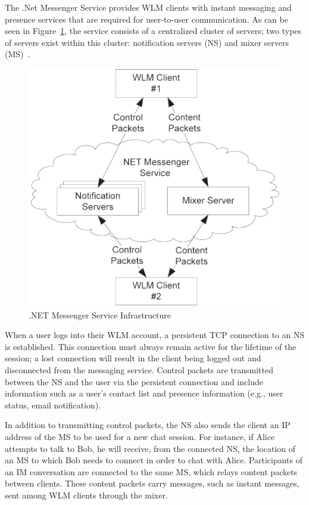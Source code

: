 \documentclass{sig-alternate}
\begin{document}
The .Net Messenger Service provides WLM clients with instant messaging and presence services that are required for user-to-user communication.
As can be seen in Figure~\ref{fig:wlminfrastructure}, the service consists of a centralized cluster of servers; two types of servers exist within this cluster: notification servers (NS) and mixer servers (MS)~\cite{torre:wlm}.

\begin{figure}[h]
	\centering
	\caption{.NET Messenger Service Infrastructure}
	\label{fig:wlminfrastructure}
	\includegraphics{graphics/infrastructure}
\end{figure}

When a user logs into their WLM account, a persistent TCP connection to an NS is established.
This connection must always remain active for the lifetime of the session; a lost connection will result in the client being logged out and disconnected from the messaging service.
Control packets are transmitted between the NS and the user via the persistent connection and include information such as a user's contact list and presence information (e.g., user status, email notification).

In addition to transmitting control packets, the NS also sends the client an IP address of the MS to be used for a new chat session.
For instance, if Alice attempts to talk to Bob, he will receive, from the connected NS, the location of an MS to which Bob needs to connect in order to chat with Alice.
Participants of an IM conversation are connected to the same MS, which relays content packets between clients.
These content packets carry messages, such as instant messages, sent among WLM clients through the mixer.
\end{document}
